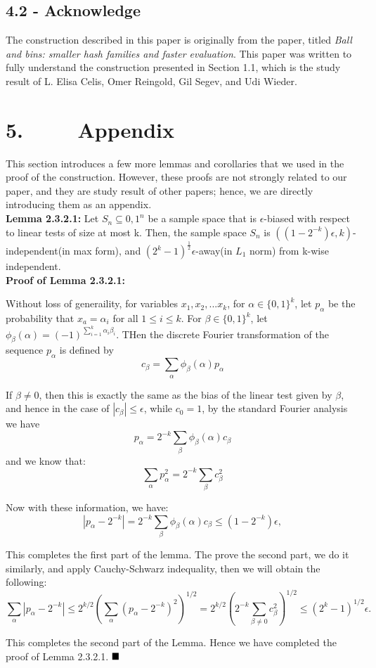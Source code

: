 \documentclass[a4paper, english]{paper}
\begin{document}
	 \subsection{4.2 - Acknowledge} 
	\quad The construction described in this paper is originally from the paper, titled \textit{Ball and bins: smaller hash families and faster evaluation}. This paper was written to fully understand the construction presented in Section 1.1, which is the study result of L. Elisa Celis, Omer Reingold, Gil Segev, and Udi Wieder. 
	 \newpage
	\section {5. $\qquad$ Appendix }
\quad	This section introduces a few more lemmas and corollaries that we used in the proof of the construction. However, these proofs are not strongly related to our paper, and they are study result of other papers; hence, we are directly introducing them as an appendix. \\
	 
	\noindent\textbf{Lemma 2.3.2.1:} Let $S_n\subseteq{0,1}^n$ be a sample space that is $\epsilon$-biased with respect to linear tests of size at most k. Then, the sample space $S_n$ is $((1-2^{-k})\epsilon,k)$-independent(in max form), and $(2^k-1)^{\frac12}\epsilon$-away(in $L_1$ norm) from k-wise independent.\\
	
	\noindent\textbf{Proof of Lemma 2.3.2.1:} \par
	Without loss of generaility, for variables $x_1, x_2, ...x_k$, for $\alpha \in \{0, 1\}^k$, let $p_{\alpha}$ be the probability that $x_a = \alpha_i$ for all $1 \le i \le k$. For $\beta \in \{0, 1\}^k$, let $\phi_{\beta}(\alpha) = (-1)^{\sum_{i=1}^{k} \alpha_i \beta_i}$. THen the discrete Fourier transformation of the sequence $p_{\alpha}$ is defined by 
	$$ c_{\beta} = \sum_{\alpha} \phi_{\beta}(\alpha)p_{\alpha}$$\par
	If $\beta \ne 0$, then this is exactly the same as the bias of the linear test given by $\beta$, and hence in the case of $|c_{\beta}| \le \epsilon$, while $c_0 = 1$, by the standard Fourier analysis we have 
	$$p_{\alpha} = 2^{-k} \sum_{\beta}\phi_{\beta}(\alpha)c_{\beta}$$ 
	and we know that:
	$$ \sum_{\alpha} p^2_{\alpha} = 2^{-k} \sum_{\beta}c^2_{\beta}$$ \par
	Now with these information, we have:
	$$ |p_{\alpha} - 2^{-k}| = 2^{-k} \sum_{\beta}\phi_{\beta}(\alpha)c_{\beta} \le (1-2^{-k})\epsilon, $$\par
	This completes the first part of the lemma. The prove the second part, we do it similarly, and apply Cauchy-Schwarz indequality, then we will obtain the following:
	$$\sum_{\alpha}|p_{\alpha} - 2^{-k}| \le 2^{k/2}(\sum_{\alpha} (p_{\alpha} - 2^{-k})^2)^{1/2} = 2^{k/2}(2^{-k}\sum_{\beta \ne 0} c^2_{\beta})^{1/2} \le (2^k-1)^{1/2}\epsilon. $$\par
	This completes the second part of the Lemma. Hence we have completed the proof of Lemma 2.3.2.1. $\hfill\blacksquare$ \\
	
\end{document}
